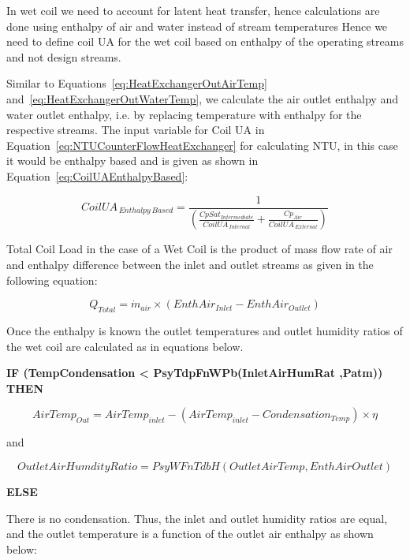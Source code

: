 In wet coil we need to account for latent heat transfer, hence calculations are done using enthalpy of air and water instead of stream temperatures Hence we need to define coil UA for the wet coil based on enthalpy of the operating streams and not design streams.

Similar to Equations~\ref{eq:HeatExchangerOutAirTemp} and~\ref{eq:HeatExchangerOutWaterTemp}, we calculate the air outlet enthalpy and water outlet enthalpy, i.e. by replacing temperature with enthalpy for the respective streams. The input variable for Coil UA in Equation~\ref{eq:NTUCounterFlowHeatExchanger} for calculating NTU, in this case it would be enthalpy based and is given as shown in Equation~\ref{eq:CoilUAEnthalpyBased}:

\begin{equation}
CoilU{A_{\,Enthalpy\,Based}} = \frac{1}{{\left( {\frac{{CpSa{t_{Intermediate}}}}{{CoilU{A_{\,Internal}}}} + \frac{{C{p_{Air}}}}{{CoilU{A_{\,External}}}}} \right)}}
\label{eq:CoilUAEnthalpyBased}
\end{equation}

Total Coil Load in the case of a Wet Coil is the product of mass flow rate of air and enthalpy difference between the inlet and outlet streams as given in the following equation:

\begin{equation}
{Q_{Total}} = {\dot{m}_{air}} \times (EnthAi{r_{Inlet}} - EnthAi{r_{Outlet}})
\end{equation}

Once the enthalpy is known the outlet temperatures and outlet humidity ratios of the wet coil are calculated as in equations below.

\textbf{IF (TempCondensation \textless{} PsyTdpFnWPb(InletAirHumRat ,Patm)) THEN}

\begin{equation}
AirTem{p_{Out}} = AirTem{p_{inlet}} - (AirTem{p_{inlet}} - Condensatio{n_{Temp}}) \times \eta
\label{eq:AirTempOutWithCondensation}
\end{equation}

and

\begin{equation}
OutletAirHumdityRatio = PsyWFnTdbH(OutletAirTemp,EnthAirOutlet)
\end{equation}

\textbf{ELSE}

There is no condensation.  Thus, the inlet and outlet humidity ratios are equal, and the outlet temperature is a function of the outlet air enthalpy as shown below:

